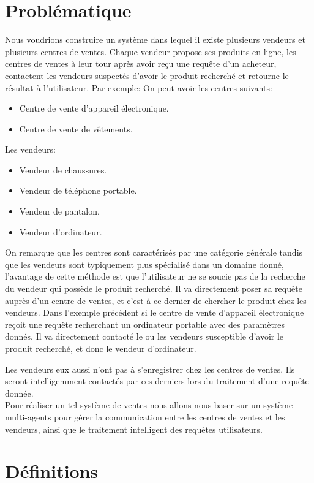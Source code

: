\section{Problématique}
Nous voudrions construire un système dans lequel il existe plusieurs vendeurs et plusieurs centres de ventes. Chaque vendeur propose ses produits en ligne, les centres de ventes à leur tour après avoir reçu une requête d’un acheteur, contactent les vendeurs suspectés d’avoir le produit recherché et retourne le résultat à l’utilisateur. Par exemple: 
On peut avoir les centres suivants:
\begin{itemize}
\item Centre de vente d’appareil électronique.
\item Centre de vente de vêtements.
\end{itemize}
Les vendeurs:
\begin{itemize}
\item Vendeur de chaussures.
\item Vendeur de téléphone portable.
\item Vendeur de pantalon.
\item Vendeur d’ordinateur.
\end{itemize}

On remarque que les centres sont caractérisés par une catégorie générale tandis que les vendeurs sont typiquement plus spécialisé dans un domaine donné, l’avantage de cette méthode est que l’utilisateur ne se soucie pas de la recherche du vendeur qui possède le produit recherché. Il va directement poser sa requête auprès d’un centre de ventes, et c’est à ce dernier de chercher le produit chez les vendeurs. Dans l’exemple précédent si le centre de vente d’appareil électronique reçoit une requête recherchant un ordinateur portable avec des paramètres donnés. Il va directement contacté le ou les vendeurs susceptible d’avoir le produit recherché, et donc le vendeur d’ordinateur.


Les vendeurs eux aussi n’ont pas à s’enregistrer chez les centres de ventes. Ils seront intelligemment contactés par ces derniers lors du traitement d’une requête donnée.\\

Pour réaliser un tel système de ventes nous allons nous baser sur un système multi-agents pour gérer la communication entre les centres de ventes et les vendeurs, ainsi que le traitement intelligent des requêtes utilisateurs.
\newpage
\section{Définitions}
